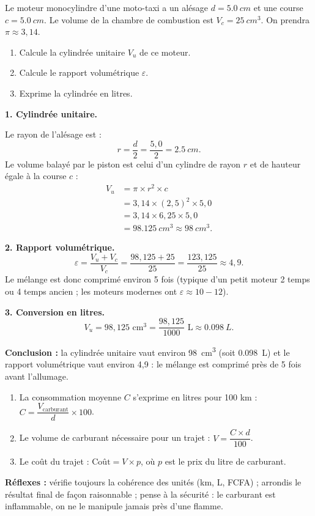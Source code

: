 \documentclass[11pt]{article}
\begin{document}
\begin{exoresolu}
Le moteur monocylindre d'une moto-taxi a un alésage $d = \SI{5,0}{cm}$ et une course $c = \SI{5,0}{cm}$. Le volume de la chambre de combustion est $V_c = \SI{25}{cm^3}$. On prendra $\pi \approx 3,14$.
\begin{enumerate}
\item Calcule la cylindrée unitaire $V_u$ de ce moteur.
\item Calcule le rapport volumétrique $\varepsilon$.
\item Exprime la cylindrée en litres.
\end{enumerate}
\tcblower
\textbf{1. Cylindrée unitaire.}

Le rayon de l'alésage est :
\[ r = \frac{d}{2} = \frac{5,0}{2} = \SI{2,5}{cm}. \]
Le volume balayé par le piston est celui d'un cylindre de rayon $r$ et de hauteur égale à la course $c$ :
\begin{align*}
V_u &= \pi \times r^2 \times c \\
&= 3,14 \times (2,5)^2 \times 5,0 \\
&= 3,14 \times 6,25 \times 5,0 \\
&= \SI{98,125}{cm^3} \approx \SI{98}{cm^3}.
\end{align*}

\textbf{2. Rapport volumétrique.}
\[ \varepsilon = \frac{V_u + V_c}{V_c} = \frac{98,125 + 25}{25} = \frac{123,125}{25} \approx 4,9. \]
Le mélange est donc comprimé environ 5 fois (typique d'un petit moteur 2 temps ou 4 temps ancien ; les moteurs modernes ont $\varepsilon \approx 10-12$).

\textbf{3. Conversion en litres.}
\[ V_u = 98,125 \text{ cm}^3 = \frac{98,125}{1000} \text{ L} \approx \SI{0,098}{L}. \]

\textbf{Conclusion :} la cylindrée unitaire vaut environ \SI{98}{cm^3} (soit \SI{0,098}{L}) et le rapport volumétrique vaut environ 4,9 : le mélange est comprimé près de 5 fois avant l'allumage.
\end{exoresolu}

\begin{methode}
\begin{enumerate}
\item La consommation moyenne $C$ s'exprime en litres pour 100 km : $C = \dfrac{V_{\text{carburant}}}{d} \times 100$.
\item Le volume de carburant nécessaire pour un trajet : $V = \dfrac{C \times d}{100}$.
\item Le coût du trajet : $\text{Coût} = V \times p$, où $p$ est le prix du litre de carburant.
\end{enumerate}
\textbf{Réflexes :} vérifie toujours la cohérence des unités (km, L, FCFA) ; arrondis le résultat final de façon raisonnable ; pense à la sécurité : le carburant est inflammable, on ne le manipule jamais près d'une flamme.
\end{methode}
\end{document}
